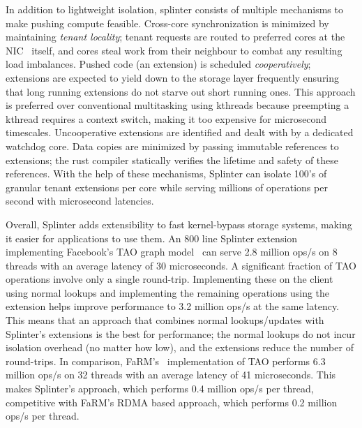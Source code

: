 In addition to lightweight isolation, splinter consists of multiple
mechanisms to make pushing compute feasible.
%
Cross-core synchronization
is minimized by maintaining \emph{tenant locality}; tenant requests are
routed
to preferred cores at the NIC~\cite{flow-director} itself, and cores
steal work from
their neighbour to combat any resulting load imbalances.
%
Pushed code (an extension) is scheduled \emph{cooperatively}; extensions are
expected to yield down to the storage layer frequently ensuring that
long running extensions do not starve out short running ones.
%
This
approach is preferred over conventional multitasking using kthreads
because preempting a kthread requires a context switch, making it too
expensive for microsecond timescales.
%
Uncooperative extensions are
identified and dealt with by a dedicated watchdog core.
%
Data copies are
minimized by passing immutable references to extensions; the rust
compiler statically verifies the lifetime and safety of these
references.
%
With the help of these mechanisms, Splinter can isolate
100’s of granular tenant extensions per core while serving millions of
operations per second with microsecond latencies.

Overall, Splinter adds extensibility to fast kernel-bypass storage
systems, making it easier for applications to use them.
%
An 800 line Splinter extension implementing Facebook’s TAO graph
model~\cite{tao-2013}
can serve 2.8 million ops/s on 8 threads with an average latency of
30 microseconds.
%
A significant fraction of TAO operations involve only a single
round-trip.
%
Implementing these on the client using normal lookups and
implementing the remaining operations using the extension helps improve
performance to 3.2 million ops/s at the same latency.
%
This means that an
approach that combines normal lookups/updates with Splinter’s extensions
is the best for performance; the normal lookups do not incur isolation
overhead (no matter how low), and the extensions reduce the number of
round-trips.
%
In comparison, FaRM’s~\cite{farm-2014} implementation of TAO performs
6.3 million
ops/s on 32 threads with an average latency of 41 microseconds.
%
This
makes Splinter’s approach, which performs 0.4 million ops/s per thread,
competitive with FaRM’s RDMA based approach, which performs 0.2 million
ops/s per thread.
